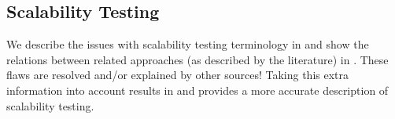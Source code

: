 
\subsection{Scalability Testing}\label{scal-test-rec}

We describe the issues with scalability testing terminology in 
and show the relations between related approaches (as described by the
literature) in . These flaws are resolved and/or
explained by other sources! Taking this extra information into account results
in  and provides a more accurate description of
scalability testing.

